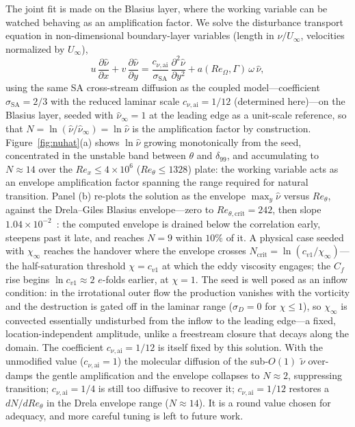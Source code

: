 \documentclass[journal]{new-aiaa}
\begin{document}
The joint fit is made on the Blasius layer, where the working
variable can be watched behaving as an amplification factor. We solve the
disturbance transport equation in
non-dimensional boundary-layer variables (length in $\nu/U_\infty$, velocities
normalized by $U_\infty$),
\begin{equation}
  u\,\frac{\partial\hat\nu}{\partial x} + v\,\frac{\partial\hat\nu}{\partial y}
  = \frac{c_{\nu,\mathrm{ai}}}{\sigma_\mathrm{SA}}\,\frac{\partial^2\hat\nu}{\partial y^2}
    + a(Re_\Omega,\Gamma)\,\omega\,\hat\nu,
  \label{eq:transport}
\end{equation}
using the same SA cross-stream diffusion as the coupled model---coefficient
$\sigma_\mathrm{SA}\!=\!2/3$ with the reduced laminar scale
$c_{\nu,\mathrm{ai}}\!=\!1/12$ (determined here)---on the Blasius layer, seeded
with $\hat\nu_\infty\!=\!1$ at the leading edge as a unit-scale reference, so that
$N\!=\!\ln(\hat\nu/\hat\nu_\infty)\!=\!\ln\hat\nu$ is the amplification factor by
construction. Figure~\ref{fig:nuhat}(a) shows $\ln\hat\nu$ growing monotonically
from the seed, concentrated in the unstable band between $\theta$ and
$\delta_{99}$, and accumulating to $N\!\approx\!14$ over the
$Re_x\!\le\!4\!\times\!10^6$ ($Re_\theta\!\le\!1328$) plate: the working variable
acts as an envelope amplification factor spanning the range required for natural
transition. Panel (b) re-plots the solution as the envelope $\max_y\hat\nu$
versus $Re_\theta$, against the Drela--Giles Blasius envelope---zero to
$Re_{\theta,\mathrm{crit}}\!=\!242$, then slope
$1.04\!\times\!10^{-2}$~\cite{drela_giles_1987}: the computed envelope is
drained below the correlation early, steepens past it late, and reaches
$N\!=\!9$ within $10\%$ of it. A physical case seeded with $\chi_\infty$ reaches the handover where
the envelope crosses $N_\mathrm{crit}\!=\!\ln(c_{v1}/\chi_\infty)$---the
half-saturation threshold $\chi\!=\!c_{v1}$ at which the eddy viscosity engages;
the $C_f$ rise begins $\ln c_{v1}\!\approx\!2$ $e$-folds earlier, at
$\chi\!=\!1$. The seed is well posed as an inflow
condition: in the irrotational outer flow the production vanishes with the
vorticity and the destruction is gated off in the laminar range ($\sigma_D\!=\!0$
for $\chi\!\le\!1$), so $\chi_\infty$ is convected essentially undisturbed from the
inflow to the leading edge---a fixed, location-independent amplitude, unlike a
freestream closure that decays along the domain.
The coefficient $c_{\nu,\mathrm{ai}}\!=\!1/12$ is itself fixed by this
solution. With the unmodified value
($c_{\nu,\mathrm{ai}}\!=\!1$) the molecular diffusion of the sub-$O(1)$
$\tilde\nu$ over-damps the gentle amplification and the envelope collapses to
$N\!\approx\!2$, suppressing transition; $c_{\nu,\mathrm{ai}}\!=\!1/4$ is still
too diffusive to recover it; $c_{\nu,\mathrm{ai}}\!=\!1/12$ restores a
$dN/dRe_\theta$ in the Drela envelope range ($N\!\approx\!14$). It is a round
value chosen for adequacy, and more careful tuning is left to future work.
\end{document}
